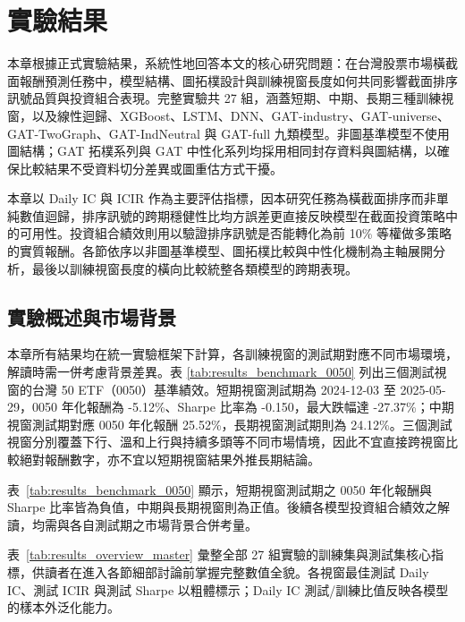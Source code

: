 \chapter{實驗結果}
\label{ch:results}

本章根據正式實驗結果，系統性地回答本文的核心研究問題：在台灣股票市場橫截面報酬預測任務中，模型結構、圖拓樸設計與訓練視窗長度如何共同影響截面排序訊號品質與投資組合表現。完整實驗共 27 組，涵蓋短期、中期、長期三種訓練視窗，以及線性迴歸、XGBoost、LSTM、DNN、GAT-industry、GAT-universe、GAT-TwoGraph、GAT-IndNeutral 與 GAT-full 九類模型。非圖基準模型不使用圖結構；GAT 拓樸系列與 GAT 中性化系列均採用相同封存資料與圖結構，以確保比較結果不受資料切分差異或圖重估方式干擾。

本章以 Daily IC 與 ICIR 作為主要評估指標，因本研究任務為橫截面排序而非單純數值迴歸，排序訊號的跨期穩健性比均方誤差更直接反映模型在截面投資策略中的可用性。投資組合績效則用以驗證排序訊號是否能轉化為前 10\% 等權做多策略的實質報酬。各節依序以非圖基準模型、圖拓樸比較與中性化機制為主軸展開分析，最後以訓練視窗長度的橫向比較統整各類模型的跨期表現。

\section{實驗概述與市場背景}
\label{sec:overview}

本章所有結果均在統一實驗框架下計算，各訓練視窗的測試期對應不同市場環境，解讀時需一併考慮背景差異。表 \ref{tab:results_benchmark_0050} 列出三個測試視窗的台灣 50 ETF（0050）基準績效。短期視窗測試期為 2024-12-03 至 2025-05-29，0050 年化報酬為 -5.12\%、Sharpe 比率為 -0.150，最大跌幅達 -27.37\%；中期視窗測試期對應 0050 年化報酬 25.52\%，長期視窗測試期則為 24.12\%。三個測試視窗分別覆蓋下行、溫和上行與持續多頭等不同市場情境，因此不宜直接跨視窗比較絕對報酬數字，亦不宜以短期視窗結果外推長期結論。



表~\ref{tab:results_benchmark_0050} 顯示，短期視窗測試期之 0050 年化報酬與 Sharpe 比率皆為負值，中期與長期視窗則為正值。後續各模型投資組合績效之解讀，均需與各自測試期之市場背景合併考量。

\FloatBarrier

表~\ref{tab:results_overview_master} 彙整全部 27 組實驗的訓練集與測試集核心指標，供讀者在進入各節細部討論前掌握完整數值全貌。各視窗最佳測試 Daily IC、測試 ICIR 與測試 Sharpe 以粗體標示；Daily IC 測試/訓練比值反映各模型的樣本外泛化能力。

